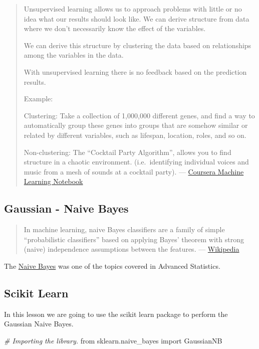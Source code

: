 \documentclass[]{book}
\newenvironment{Shaded}{\begin{snugshade}}{\end{snugshade}}
\newcommand{\ImportTok}[1]{#1}
\newcommand{\CommentTok}[1]{\textcolor[rgb]{0.56,0.35,0.01}{\textit{#1}}}
\newcommand{\NormalTok}[1]{#1}
\begin{document}
\begin{quote}
Unsupervised learning allows us to approach problems with little or no
idea what our results should look like. We can derive structure from
data where we don't necessarily know the effect of the variables.

We can derive this structure by clustering the data based on
relationships among the variables in the data.

With unsupervised learning there is no feedback based on the prediction
results.

Example:

Clustering: Take a collection of 1,000,000 different genes, and find a
way to automatically group these genes into groups that are somehow
similar or related by different variables, such as lifespan, location,
roles, and so on.

Non-clustering: The ``Cocktail Party Algorithm'', allows you to find
structure in a chaotic environment. (i.e.~identifying individual voices
and music from a mesh of sounds at a cocktail party). ---
\href{https://www.coursera.org/learn/machine-learning}{Coursera Machine
Learning Notebook}
\end{quote}

\subsection{Gaussian - Naive Bayes}\label{gaussian---naive-bayes}

\begin{quote}
In machine learning, naive Bayes classifiers are a family of simple
``probabilistic classifiers'' based on applying Bayes' theorem with
strong (naive) independence assumptions between the features. ---
\href{https://en.wikipedia.org/wiki/Naive_Bayes_classifier}{Wikipedia}
\end{quote}

The
\href{https://andersonuyekita.github.io/ND111_data_science_foundations_02/bayes-rule-lesson-07.html}{Naive
Bayes} was one of the topics covered in Advanced Statistics.

\subsection{Scikit Learn}\label{scikit-learn}

In this lesson we are going to use the scikit learn package to perform
the Gaussian Naive Bayes.

\begin{Shaded}
\begin{Highlighting}[]
\CommentTok{# Importing the library.}
\ImportTok{from}\NormalTok{ sklearn.naive_bayes }\ImportTok{import}\NormalTok{ GaussianNB}
\end{Highlighting}
\end{Shaded}
\end{document}
